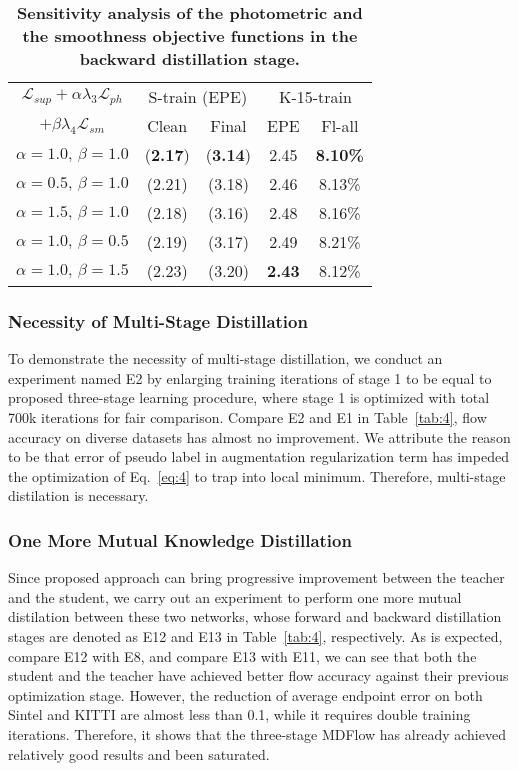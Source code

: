 \documentclass[lettersize,journal]{IEEEtran}
\begin{document}
\begin{table}[t]
	\caption{\textbf{Sensitivity analysis of the photometric and the smoothness objective functions in the backward distillation stage.}}
	\label{tab:6}
	\centering
	\renewcommand{\arraystretch}{1.1}
	\tabcolsep=4.0mm
	\begin{tabular}{ccccc}
		\toprule
		$\mathcal{L}_{sup} + \alpha\lambda_3 \mathcal{L}_{ph}$ & \multicolumn{2}{c}{S-train (EPE)} & \multicolumn{2}{c}{K-15-train} \\
		\cmidrule(lr){2-3}
		\cmidrule(lr){4-5}
		$ + \beta \lambda_4 \mathcal{L}_{sm}$ & Clean & Final & EPE & Fl-all \\
		\midrule
		$\alpha=1.0, \, \beta=1.0$ & (\textbf{2.17}) & (\textbf{3.14}) & 2.45 & \textbf{8.10\%} \\
		$\alpha=0.5, \, \beta=1.0$ & (2.21) & (3.18) & 2.46 & 8.13\% \\
		$\alpha=1.5, \, \beta=1.0$ & (2.18) & (3.16) & 2.48 & 8.16\% \\
		$\alpha=1.0, \, \beta=0.5$ & (2.19) & (3.17) & 2.49 & 8.21\% \\
		$\alpha=1.0, \, \beta=1.5$ & (2.23) & (3.20) & \textbf{2.43} & 8.12\% \\
		\bottomrule
	\end{tabular}
\end{table}

\subsubsection{Necessity of Multi-Stage Distillation}
To demonstrate the necessity of multi-stage distillation, we conduct an experiment named E2 by enlarging training iterations of stage 1 to be equal to proposed three-stage learning procedure, where stage 1 is optimized with total 700k iterations for fair comparison. Compare E2 and E1 in Table~\ref{tab:4}, flow accuracy on diverse datasets has almost no improvement. We attribute the reason to be that error of pseudo label in augmentation regularization term has impeded the optimization of Eq.~\ref{eq:4} to trap into local minimum. Therefore, multi-stage distilation is necessary.

\subsubsection{One More Mutual Knowledge Distillation}
Since proposed approach can bring progressive improvement between the teacher and the student, we carry out an experiment to perform one more mutual distilation between these two networks, whose forward and backward distillation stages are denoted as E12 and E13 in Table~\ref{tab:4}, respectively. As is expected, compare E12 with E8, and compare E13 with E11, we can see that both the student and the teacher have achieved better flow accuracy against their previous optimization stage. However, the reduction of average endpoint error on both Sintel and KITTI are almost less than 0.1, while it requires double training iterations. Therefore, it shows that the three-stage MDFlow has already achieved relatively good results and been saturated.
\end{document}
